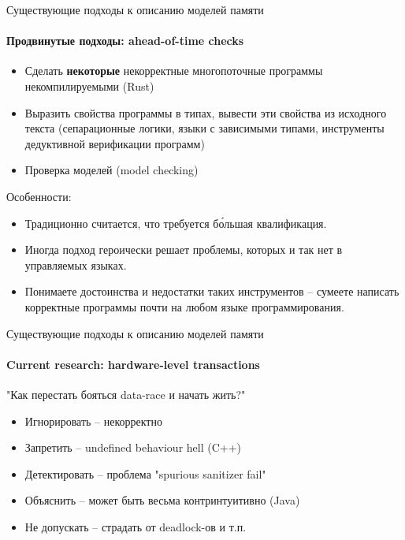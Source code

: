 \begin{frame}{Существующие подходы к описанию моделей памяти}
\framesubtitle{Продвинутые подходы: ahead-of-time checks}

\begin{itemize}
	\pause
	\item Сделать \textbf{некоторые} некорректные многопоточные программы некомпилируемыми (Rust)
	\pause
	\item Выразить свойства программы в типах, вывести эти свойства из исходного текста (сепарационные логики, языки с зависимыми типами, инструменты дедуктивной верификации программ)
	\pause
	\item Проверка моделей (model checking)
\end{itemize}

\pause
Особенности:
\begin{itemize}
	\item Традиционно считается, что требуется б\'{о}льшая квалификация.
	\item Иногда подход героически решает проблемы, которых и так нет в управляемых языках.
	\item Понимаете достоинства и недостатки таких инструментов -- сумеете написать корректные программы почти на любом языке программирования.
\end{itemize}
\end{frame}


\begin{frame}[t]{Существующие подходы к описанию моделей памяти}
\framesubtitle{Current research: hardware-level transactions}

"Как перестать бояться data-race и начать жить?"

\pause

\begin{itemize}
	\item Игнорировать -- некорректно

	\pause
	\item Запретить -- undefined behaviour hell (C++)

	\pause
	\item Детектировать -- проблема "spurious sanitizer fail"

	\pause
	\item Объяснить -- может быть весьма контринтуитивно (Java)

	\pause
	\item Не допускать -- страдать от deadlock-ов и т.п.
\end{itemize}

\end{frame}



